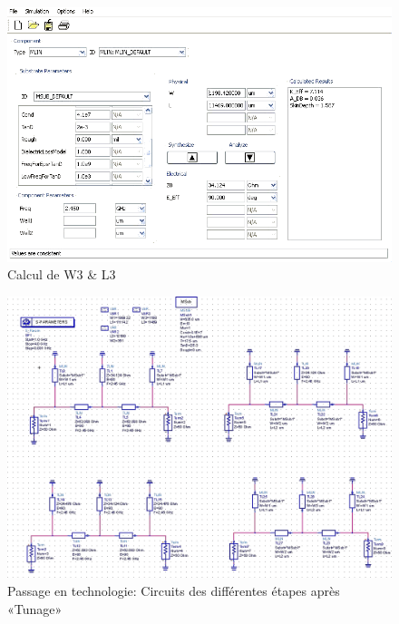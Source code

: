 \documentclass[10pt]{article}
\begin{document}
\begin{figure}
    \begin{center}
        \includegraphics[width=15cm]{p21_W3_L3}
    \end{center}
    \caption{Calcul de W3 \& L3}
\end{figure}

\begin{figure}
    \begin{center}
        \includegraphics[width=15cm]{p21_Circuit}
    \end{center}
    \caption{Passage en technologie: Circuits des différentes étapes après «Tunage»}
\end{figure}
\end{document}
